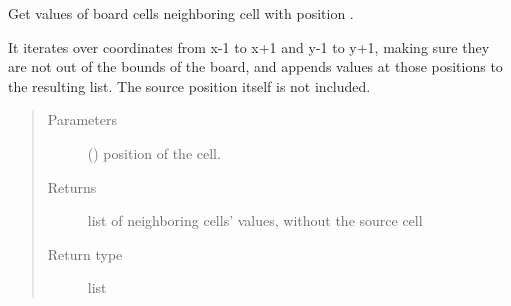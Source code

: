\documentclass[letterpaper,10pt,english,openany,oneside]{sphinxmanual}
\begin{document}
\begin{fulllineitems}
\begin{fulllineitems}
\end{fulllineitems}


\begin{fulllineitems}
\label{\detokenize{neutron:neutron.NeutronBoard.neighbors}}
Get values of board cells neighboring cell with position .

It iterates over coordinates from x-1 to x+1 and y-1 to y+1, making
sure they are not out of the bounds of the board, and appends values
at those positions to the resulting list. The source position itself
is not included.
\begin{quote}\begin{description}
\item[{Parameters}] \leavevmode
{} ({\hyperref[\detokenize{util:util.Vec}]{}}) \textendash{} position of the cell.

\item[{Returns}] \leavevmode
list of neighboring cells’ values, without the source cell

\item[{Return type}] \leavevmode
list

\end{description}\end{quote}

\end{fulllineitems}


\end{fulllineitems}

\end{document}
